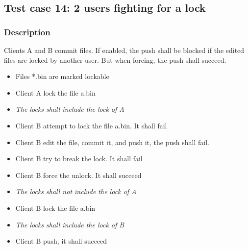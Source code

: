 \subsection{Test case 14: 2 users fighting for a lock}

\subsubsection{Description}

Clients A and B commit files. If enabled, the push shall be blocked if the edited files are locked by another user. But when forcing, the push shall succeed.

\begin{itemize}
    \item Files *.bin are marked lockable
    \item Client A lock the file a.bin
    \item \textit{The locks shall include the lock of A}
    \item Client B attempt to lock the file a.bin. It shall fail
    \item Client B edit the file, commit it, and push it, the push shall fail.
    \item Client B try to break the lock. It shall fail
    \item Client B force the unlock. It shall succeed
    \item \textit{The locks shall not include the lock of A}
    \item Client B lock the file a.bin
    \item \textit{The locks shall include the lock of B}
    \item Client B push, it shall succeed
\end{itemize}




